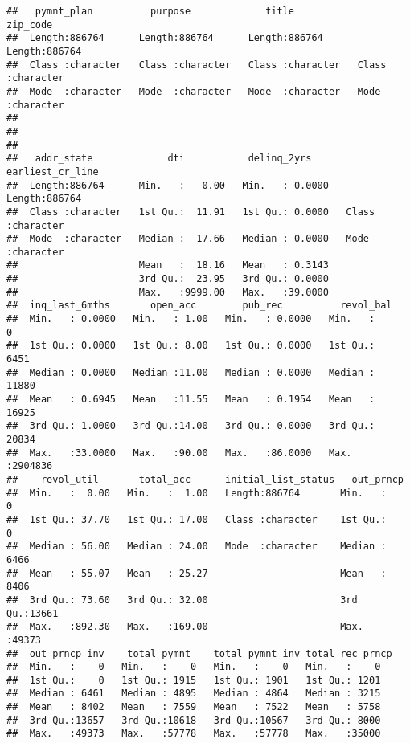 \documentclass[
]{article}
\begin{document}
\begin{verbatim}
##   pymnt_plan          purpose             title             zip_code        
##  Length:886764      Length:886764      Length:886764      Length:886764     
##  Class :character   Class :character   Class :character   Class :character  
##  Mode  :character   Mode  :character   Mode  :character   Mode  :character  
##                                                                             
##                                                                             
##                                                                             
##   addr_state             dti           delinq_2yrs      earliest_cr_line  
##  Length:886764      Min.   :   0.00   Min.   : 0.0000   Length:886764     
##  Class :character   1st Qu.:  11.91   1st Qu.: 0.0000   Class :character  
##  Mode  :character   Median :  17.66   Median : 0.0000   Mode  :character  
##                     Mean   :  18.16   Mean   : 0.3143                     
##                     3rd Qu.:  23.95   3rd Qu.: 0.0000                     
##                     Max.   :9999.00   Max.   :39.0000                     
##  inq_last_6mths       open_acc        pub_rec          revol_bal      
##  Min.   : 0.0000   Min.   : 1.00   Min.   : 0.0000   Min.   :      0  
##  1st Qu.: 0.0000   1st Qu.: 8.00   1st Qu.: 0.0000   1st Qu.:   6451  
##  Median : 0.0000   Median :11.00   Median : 0.0000   Median :  11880  
##  Mean   : 0.6945   Mean   :11.55   Mean   : 0.1954   Mean   :  16925  
##  3rd Qu.: 1.0000   3rd Qu.:14.00   3rd Qu.: 0.0000   3rd Qu.:  20834  
##  Max.   :33.0000   Max.   :90.00   Max.   :86.0000   Max.   :2904836  
##    revol_util       total_acc      initial_list_status   out_prncp    
##  Min.   :  0.00   Min.   :  1.00   Length:886764       Min.   :    0  
##  1st Qu.: 37.70   1st Qu.: 17.00   Class :character    1st Qu.:    0  
##  Median : 56.00   Median : 24.00   Mode  :character    Median : 6466  
##  Mean   : 55.07   Mean   : 25.27                       Mean   : 8406  
##  3rd Qu.: 73.60   3rd Qu.: 32.00                       3rd Qu.:13661  
##  Max.   :892.30   Max.   :169.00                       Max.   :49373  
##  out_prncp_inv    total_pymnt    total_pymnt_inv total_rec_prncp
##  Min.   :    0   Min.   :    0   Min.   :    0   Min.   :    0  
##  1st Qu.:    0   1st Qu.: 1915   1st Qu.: 1901   1st Qu.: 1201  
##  Median : 6461   Median : 4895   Median : 4864   Median : 3215  
##  Mean   : 8402   Mean   : 7559   Mean   : 7522   Mean   : 5758  
##  3rd Qu.:13657   3rd Qu.:10618   3rd Qu.:10567   3rd Qu.: 8000  
##  Max.   :49373   Max.   :57778   Max.   :57778   Max.   :35000  

\end{verbatim}
\end{document}
